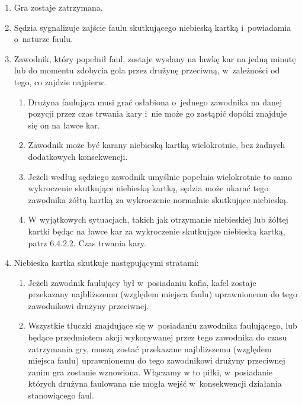 \documentclass[12pt,a4paper]{article}
\begin{document}
\begin{enumerate}
	\item
	      Gra zostaje zatrzymana.
	\item
	      Sędzia sygnalizuje zajście faulu skutkującego niebieską kartką i~powiadamia o~naturze faulu.
	\item
	      Zawodnik, który popełnił faul, zostaje wysłany na ławkę kar na jedną
	      minutę lub do momentu zdobycia gola przez drużynę przeciwną, w~zależności od tego, co zajdzie najpierw.

	      \begin{enumerate}
		      \item
		            Drużyna faulująca musi grać osłabiona o~jednego zawodnika na danej
		            pozycji przez czas trwania kary i~nie może go zastąpić dopóki
		            znajduje się on na ławce kar.
		      \item
		            Zawodnik może być karany niebieską kartką wielokrotnie, bez żadnych
		            dodatkowych konsekwencji.
		      \item
		            Jeżeli według sędziego zawodnik umyślnie popełnia wielokrotnie to
		            samo wykroczenie skutkujące niebieską kartką, sędzia może ukarać
		            tego zawodnika żółtą kartką za wykroczenie normalnie skutkujące
		            niebieską.
		      \item
		            W wyjątkowych sytuacjach, takich jak otrzymanie niebieskiej lub
		            żółtej kartki będąc na ławce kar za wykroczenie skutkujące niebieską
		            kartką, patrz 6.4.2.2. Czas trwania kary.
	      \end{enumerate}
	\item
	      Niebieska kartka skutkuje następującymi stratami:

	      \begin{enumerate}
		      \item
		            Jeżeli zawodnik faulujący był w~posiadaniu kafla, kafel zostaje
		            przekazany najbliższemu (względem miejsca faulu)
		            uprawnionemu do tego zawodnikowi drużyny przeciwnej.
		      \item
		            Wszystkie tłuczki znajdujące się w~posiadaniu zawodnika faulującego, lub
		            będące przedmiotem akcji wykonywanej przez tego zawodnika do czasu zatrzymania gry, muszą
		            zostać przekazane najbliższemu (względem miejsca faulu) uprawnionemu do tego zawodnikowi drużyny przeciwnej zanim gra
		            zostanie wznowiona. Włączamy w to piłki, w~posiadanie których
		            drużyna faulowana nie mogła wejść w~konsekwencji działania
		            stanowiącego faul.


\end{enumerate}
\end{enumerate}
\end{document}
